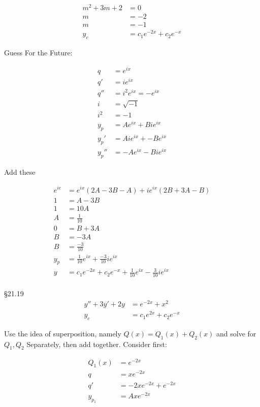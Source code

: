 \begin{rvw}
\begin{ex}
\begin{align*}
    m^2+3m+2&=0\\
    m&=-2\\
    m&=-1\\
    y_c&= c_1 e^{-2x}+c_2e^{-x}
\end{align*}
\begin{note}
Guess For the Future:
\end{note}
\begin{align*}
    q&=e^{ix}\\
    q'&=ie^{ix}\\
    q''&=i^2e^{ix}=-e^{ix}\\
    i&=\sqrt{-1}\\
    i^2&=-1\\
    y_p&=Ae^{ix}+Bie^{ix}\\
    y_p'&=Aie^{ix}+-Be^{ix}\\
    y_p''&=-Ae^{ix}-Bie^{ix}
\end{align*}
\begin{note}
Add these
\end{note}
\begin{align*}
    e^{ie}&=e^{ix}(2A-3B-A)+ie^{ix}(2B+3A-B)\\
    1&=A-3B\\
    1&=10A\\
    A&=\frac{1}{10}\\
    0&=B+3A\\
    B&=-3A\\
    B&=\frac{-3}{10}\\
    y_p&=\frac{1}{10}e^{ix}+\frac{-3}{10}ie^{ix}\\
    y&=c_1e^{-2x}+c_2e^{-x}+\frac{1}{10}e^{ix}-\frac{3}{10}ie^{ix}\\
\end{align*}
\end{ex}
\begin{ex}
\S 21.19
\begin{align*}
    y''+3y'+2y&=e^{-2x}+x^2\\
    y_c&=c_1e^{2x}+c_2e^{-x}
\end{align*}
\begin{note}
Use the idea of superposition, namely $Q(x)=Q_1(x)+Q_2(x)$ and solve for $Q_1, Q_2$ Separately, then add together. Consider first:
\end{note}
\begin{align*}
    Q_1(x)&=e^{-2x}\\
    q&=xe^{-2x}\\
    q'&=-2xe^{-2x}+e^{-2x}\\
    y_{p_1}&= Axe^{-2x}\\

\end{align*}
\end{ex}
\end{rvw}
